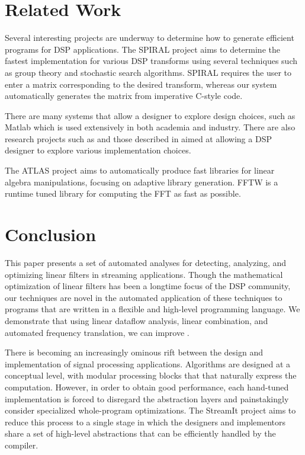 \section{Related Work}
\label{sec:related}

Several interesting projects are underway to determine how to generate
efficient programs for DSP applications. The SPIRAL
project\cite{spiral,xiong-thesis,xiong01spl,johnson01searching,egner01automatic}
aims to determine the fastest implementation for various DSP
transforms using several techniques such as group theory and
stochastic search algorithms.  SPIRAL requires the user to enter a
matrix corresponding to the desired transform, whereas our system
automatically generates the matrix from imperative C-style code.

There are many systems that allow a designer to explore design
choices, such as Matlab\cite{matlab} which is used extensively in both
academia and industry.  There are also research projects such as
\cite{covell-ade} and those described in \cite{oppenheim-symbolic}
aimed at allowing a DSP designer to explore various implementation
choices.

The ATLAS project \cite{whaley01automated} aims to automatically
produce fast libraries for linear algebra manipulations, focusing on
adaptive library generation.  FFTW \cite{frigo99fast,fftw} is a
runtime tuned library for computing the FFT as fast as possible.


\section{Conclusion}
\label{sec:conclusion}

This paper presents a set of automated analyses for detecting,
analyzing, and optimizing linear filters in streaming applications.
Though the mathematical optimization of linear filters has been a
longtime focus of the DSP community, our techniques are novel in the
automated application of these techniques to programs that are written
in a flexible and high-level programming language.  We demonstrate
that using linear dataflow analysis, linear combination, and automated
frequency translation, we can improve .

There is becoming an increasingly ominous rift between the design and
implementation of signal processing applications.  Algorithms are
designed at a conceptual level, with modular processing blocks that
that naturally express the computation.  However, in order to obtain
good performance, each hand-tuned implementation is forced to
disregard the abstraction layers and painstakingly consider
specialized whole-program optimizations.  The StreamIt project aims to
reduce this process to a single stage in which the designers and
implementors share a set of high-level abstractions that can be
efficiently handled by the compiler.  

